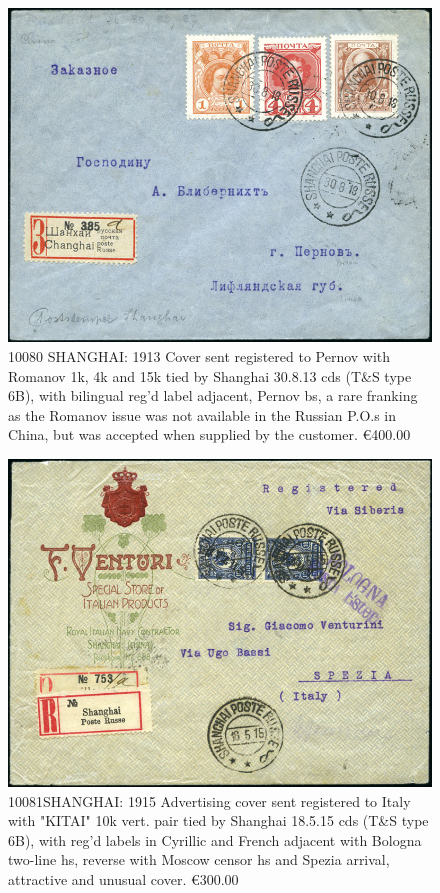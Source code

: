 \begin{figure}[htbp]
\centering
\includegraphics[width=.95\textwidth]{../russian-post-offices-in-china/10080.jpg}
\caption{
 10080 SHANGHAI: 1913 Cover sent registered to Pernov with Romanov 1k,
 4k and 15k tied by Shanghai 30.8.13 cds (T\&S type 6B), with bilingual reg'd 
 label adjacent, Pernov bs, a rare franking as the Romanov issue was not 
 available in the Russian P.O.s in China, but was accepted when supplied 
 by the customer.
\euro 400.00
}  
\end{figure}

\begin{figure}[htbp]
\centering
\includegraphics[width=.95\textwidth]{../russian-post-offices-in-china/10081.jpg}
\caption{
10081SHANGHAI: 1915 Advertising cover sent registered to Italy with "KITAI" 10k
vert. pair tied by Shanghai 18.5.15 cds (T\&S type 6B), with reg'd labels in 
Cyrillic and French adjacent with Bologna two-line hs, reverse with Moscow 
censor hs and Spezia arrival, attractive and unusual cover.
\euro 300.00  
}  
\end{figure}
            
